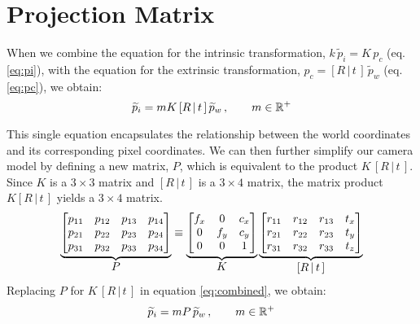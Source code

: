 \section{Projection Matrix} \label{sec:projection}

When we combine the equation for the intrinsic transformation, $k\,\widetilde{p}_i = K\,p_c$ (eq. \ref{eq:pi}), with the equation for the extrinsic transformation, $p_c = [R\,|\,t\,]\,\widetilde{p}_w$ (eq. \ref{eq:pc}), we obtain:
\begin{equation} \label{eq:combined}
    \widetilde{p}_{i} = mK\,[R\,|\,t\,]\,\widetilde{p}_{w}\,, \qquad m \in \mathbb{R}^+
\end{equation}

This single equation encapsulates the relationship between the world coordinates and its corresponding pixel coordinates. We can then further simplify our camera model by defining a new matrix, $P$, which is equivalent to the product $K\,[R\,|\,t\,]$. Since $K$ is a $3 \times 3$ matrix and $[R\,|\,t\,]$ is a $3 \times 4$ matrix, the matrix product $K[R\,|\,t\,]$ yields a $3 \times 4$ matrix. 
\begin{equation}
    \underbrace{
        \begin{bmatrix}
        p_{11} & p_{12} & p_{13} & p_{14} \\
        p_{21} & p_{22} & p_{23} & p_{24} \\
        p_{31} & p_{32} & p_{33} & p_{34}
    \end{bmatrix}
    }_{\mathlarger{P}}
    \equiv
    \underbrace{
        \begin{bmatrix}
            f_x & 0   & c_x \\
            0   & f_y & c_y \\
            0   & 0   & 1
        \end{bmatrix}
    }_{\mathlarger{K}}
    \underbrace{
        \begin{bmatrix}
            r_{11} & r_{12} & r_{13} & t_x \\
            r_{21} & r_{22} & r_{23} & t_y \\
            r_{31} & r_{32} & r_{33} & t_z \\
        \end{bmatrix}
    }_{\mathlarger{[R\,|\,t\,]}}
\end{equation}
Replacing $P$ for $K\,[R\,|\,t\,]$ in equation \ref{eq:combined}, we obtain:
\begin{equation} \label{eq:project}
    \widetilde{p}_{i} = mP\,\widetilde{p}_{w}\,, \qquad m \in \mathbb{R}^+
\end{equation}
